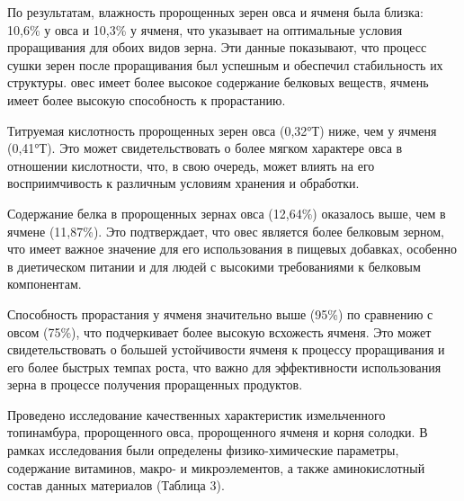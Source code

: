 \begin{multicols}{2}
По результатам, влажность пророщенных зерен овса и ячменя была близка:
10,6\% у овса и 10,3\% у ячменя, что указывает на оптимальные условия
проращивания для обоих видов зерна. Эти данные показывают, что процесс
сушки зерен после проращивания был успешным и обеспечил стабильность их
структуры. овес имеет более высокое содержание белковых веществ, ячмень
имеет более высокую способность к прорастанию.

Титруемая кислотность пророщенных зерен овса (0,32°Т) ниже, чем у ячменя
(0,41°Т). Это может свидетельствовать о более мягком характере овса в
отношении кислотности, что, в свою очередь, может влиять на его
восприимчивость к различным условиям хранения и обработки.

Содержание белка в пророщенных зернах овса (12,64\%) оказалось выше, чем
в ячмене (11,87\%). Это подтверждает, что овес является более белковым
зерном, что имеет важное значение для его использования в пищевых
добавках, особенно в диетическом питании и для людей с высокими
требованиями к белковым компонентам.

Способность прорастания у ячменя значительно выше (95\%) по сравнению с
овсом (75\%), что подчеркивает более высокую всхожесть ячменя. Это может
свидетельствовать о большей устойчивости ячменя к процессу проращивания
и его более быстрых темпах роста, что важно для эффективности
использования зерна в процессе получения проращенных продуктов.

Проведено исследование качественных характеристик измельченного
топинамбура, пророщенного овса, пророщенного ячменя и корня солодки. В
рамках исследования были определены физико-химические параметры,
содержание витаминов, макро- и микроэлементов, а также аминокислотный
состав данных материалов (Таблица 3).
\end{multicols}

